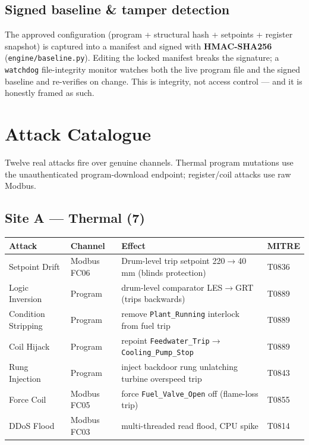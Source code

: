 \documentclass[11pt,a4paper]{article}
\newcommand{\code}[1]{\texttt{\small #1}}
\begin{document}
\subsection{Signed baseline \& tamper detection}
The approved configuration (program + structural hash + setpoints + register snapshot) is captured
into a manifest and signed with \textbf{HMAC-SHA256} (\code{engine/baseline.py}). Editing the locked
manifest breaks the signature; a \code{watchdog} file-integrity monitor watches both the live
program file and the signed baseline and re-verifies on change. This is integrity, not access
control --- and it is honestly framed as such.

\section{Attack Catalogue}
Twelve real attacks fire over genuine channels. Thermal program mutations use the unauthenticated
program-download endpoint; register/coil attacks use raw Modbus.

\subsection{Site A --- Thermal (7)}
\begin{table}[h]\small\centering
\renewcommand{\arraystretch}{1.15}
\begin{tabularx}{\textwidth}{@{}l l L l@{}}
\toprule
\textbf{Attack} & \textbf{Channel} & \textbf{Effect} & \textbf{MITRE}\\
\midrule
Setpoint Drift & Modbus FC06 & Drum-level trip setpoint 220$\to$40\,mm (blinds protection) & T0836\\
Logic Inversion & Program & drum-level comparator LES$\to$GRT (trips backwards) & T0889\\
Condition Stripping & Program & remove \code{Plant\_Running} interlock from fuel trip & T0889\\
Coil Hijack & Program & repoint \code{Feedwater\_Trip}$\to$\code{Cooling\_Pump\_Stop} & T0889\\
Rung Injection & Program & inject backdoor rung unlatching turbine overspeed trip & T0843\\
Force Coil & Modbus FC05 & force \code{Fuel\_Valve\_Open} off (flame-loss trip) & T0855\\
DDoS Flood & Modbus FC03 & multi-threaded read flood, CPU spike & T0814\\
\bottomrule
\end{tabularx}
\end{table}
\end{document}
